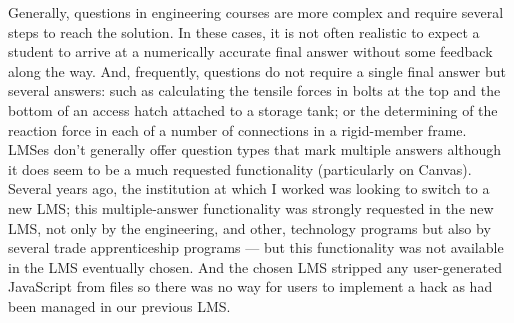 \documentclass{tufte-handout}
\begin{document}
\parm
Generally, questions in engineering courses are more complex and require several steps to reach the solution. In these cases, it is not often realistic to expect a student to arrive at a numerically accurate final answer without some feedback along the way. And, frequently, questions do not require a single final answer but several answers: such as calculating the tensile forces in bolts at the top and the bottom of an access hatch attached to a storage tank; or the determining of the reaction force in each of a number of connections in a rigid-member frame.
\newpage
LMSes don't generally offer question types that mark multiple answers although it does seem to be a much requested functionality (particularly on Canvas). Several years ago, the institution at which I worked was looking to switch to a new LMS; this multiple-answer functionality was strongly requested in the new LMS, not only by the engineering, and other, technology programs but also by several trade apprenticeship programs --- but this functionality was not available in the LMS eventually chosen. And the chosen LMS stripped any user-generated JavaScript from files so there was no way for users to implement a hack as had been managed in our previous LMS.
\end{document}
